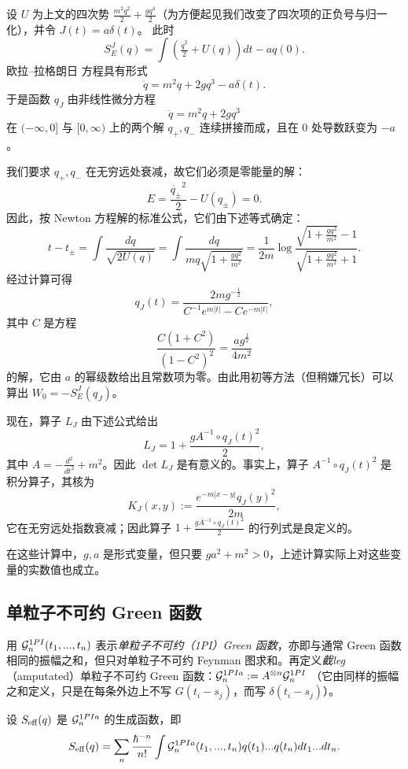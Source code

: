 \begin{example} 设 $U$ 为上文的四次势 $\frac{m^2q^2}{2}+\frac{gq^4}{2}$（为方便起见我们改变了四次项的正负号与归一化），并令 $J(t)=a\delta(t)$。
此时
$$
S_E^J(q)=\int(\tfrac{\dot{q}^2}{2}+U(q))dt-aq(0).
$$ 
欧拉–拉格朗日 方程具有形式
$$
\ddot{q}=m^2q+2gq^3-a\delta(t).
$$
于是函数 $q_J$ 由非线性微分方程
$$
\ddot{q}=m^2q+2gq^3
$$ 
在 $(-\infty,0]$ 与 $[0,\infty)$ 上的两个解 $q_+,q_-$ 连续拼接而成，且在 $0$ 处导数跃变为 $-a$。

我们要求 $q_+,q_-$ 在无穷远处衰减，故它们必须是零能量的解：
$$
E=\frac{\dot{q_\pm}^2}{2}-U(q_\pm)=0.
$$
因此，按 Newton 方程解的标准公式，它们由下述等式确定：
$$
t-t_{\pm}=\int\frac{dq}{\sqrt{2U(q)}}=\int \frac{dq}{mq\sqrt{1+\frac{gq^2}
{m^2}}}=
\frac{1}{2m}\log\frac{\sqrt{1+\frac{gq^2}{m^2}}-1}
{\sqrt{1+\frac{gq^2}{m^2}}+1}.
$$
经过计算可得
$$
q_J(t)=\frac{2mg^{-\frac{1}{2}}}{C^{-1}e^{m|t|}-Ce^{-m|t|}},
$$
其中 $C$ 是方程
$$
\frac{C(1+C^2)}{(1-C^2)^2}=\frac{ag^{\frac{1}{2}}}{4m^2}
$$
的解，它由 $a$ 的幂级数给出且常数项为零。由此用初等方法（但稍嫌冗长）可以算出 $W_0=-S_E^J(q_J)$。

现在，算子 $L_J$ 由下述公式给出
$$
L_J=1+\frac{gA^{-1}\circ q_J(t)^2}{2},
$$ 
其中 $A=-\frac{d^2}{dt^2}+m^2$。因此 $\det L_J$ 是有意义的。事实上，算子 $A^{-1}\circ q_J(t)^2$ 是积分算子，其核为
$$
K_J(x,y):=\frac{e^{-m|x-y|}q_J(y)^2}{2m},
$$ 
它在无穷远处指数衰减；因此算子 $1+\frac{gA^{-1}\circ q_J(t)^2}{2}$ 的行列式是良定义的。
\end{example}

\begin{remark} 在这些计算中，$g, a$ 是形式变量，但只要 $ga^2+m^2>0$，上述计算实际上对这些变量的实数值也成立。
\end{remark} 

\subsection{单粒子不可约 Green 函数}

用 $\mathcal{G}^{1PI}_n(t_1,...,t_n)$ 表示\emph{单粒子不可约（1PI）Green 函数}，亦即与通常 Green 函数相同的振幅之和，但只对单粒子不可约 Feynman 图求和。再定义\emph{截leg}（amputated）单粒子不可约 Green 函数：$\mathcal{G}^{1PIa}_n:=A^{\otimes n}\mathcal{G}^{1PI}_n$
（它由同样的振幅之和定义，只是在每条外边上不写 $G(t_i-s_j)$，而写 $\delta(t_i-s_j)$）。

设 $S_{\rm eff}(q)$ 是 $\mathcal{G}_n^{1PIa}$ 的生成函数，即
$$
S_{\rm eff}(q)=\sum_n\frac{\hbar^{-n}}{n!}\int
\mathcal{G}^{1PIa}_n(t_1,...,t_n)
q(t_1)...q(t_n)dt_1...dt_n.
$$

